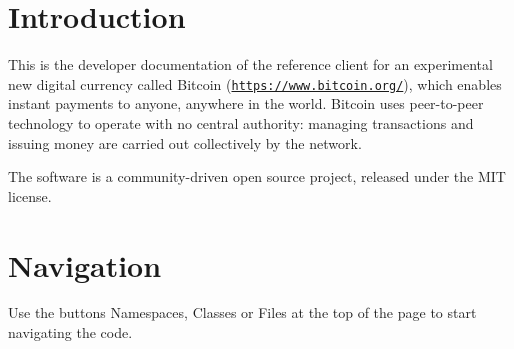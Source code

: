 \hypertarget{index_intro_sec}{}\section{Introduction}\label{index_intro_sec}
This is the developer documentation of the reference client for an experimental new digital currency called Bitcoin (\href{https://www.bitcoin.org/}{\tt https\+://www.\+bitcoin.\+org/}), which enables instant payments to anyone, anywhere in the world. Bitcoin uses peer-\/to-\/peer technology to operate with no central authority\+: managing transactions and issuing money are carried out collectively by the network.

The software is a community-\/driven open source project, released under the M\+IT license.\hypertarget{index_Navigation}{}\section{Navigation}\label{index_Navigation}
Use the buttons {\ttfamily Namespaces}, {\ttfamily Classes} or {\ttfamily Files} at the top of the page to start navigating the code. 
